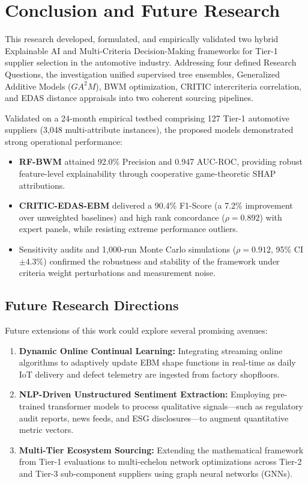 \documentclass[twocolumn,10pt]{article}
\begin{document}
\section{Conclusion and Future Research}
\label{sec:conclusion}

This research developed, formulated, and empirically validated two hybrid Explainable AI and Multi-Criteria Decision-Making frameworks for Tier-1 supplier selection in the automotive industry. Addressing four defined Research Questions, the investigation unified supervised tree ensembles, Generalized Additive Models ($GA^2M$), BWM optimization, CRITIC intercriteria correlation, and EDAS distance appraisals into two coherent sourcing pipelines.

Validated on a 24-month empirical testbed comprising 127 Tier-1 automotive suppliers (3,048 multi-attribute instances), the proposed models demonstrated strong operational performance:
\begin{itemize}
    \item \textbf{RF-BWM} attained 92.0\% Precision and 0.947 AUC-ROC, providing robust feature-level explainability through cooperative game-theoretic SHAP attributions.
    \item \textbf{CRITIC-EDAS-EBM} delivered a 90.4\% F1-Score (a 7.2\% improvement over unweighted baselines) and high rank concordance ($\rho = 0.892$) with expert panels, while resisting extreme performance outliers.
    \item Sensitivity audits and 1,000-run Monte Carlo simulations ($\rho = 0.912$, 95\% CI $\pm 4.3\%$) confirmed the robustness and stability of the framework under criteria weight perturbations and measurement noise.
\end{itemize}

\subsection{Future Research Directions}
Future extensions of this work could explore several promising avenues:
\begin{enumerate}
    \item \textbf{Dynamic Online Continual Learning:} Integrating streaming online algorithms to adaptively update EBM shape functions in real-time as daily IoT delivery and defect telemetry are ingested from factory shopfloors.
    \item \textbf{NLP-Driven Unstructured Sentiment Extraction:} Employing pre-trained transformer models to process qualitative signals—such as regulatory audit reports, news feeds, and ESG disclosures—to augment quantitative metric vectors.
    \item \textbf{Multi-Tier Ecosystem Sourcing:} Extending the mathematical framework from Tier-1 evaluations to multi-echelon network optimizations across Tier-2 and Tier-3 sub-component suppliers using graph neural networks (GNNs).
\end{enumerate}
\end{document}
